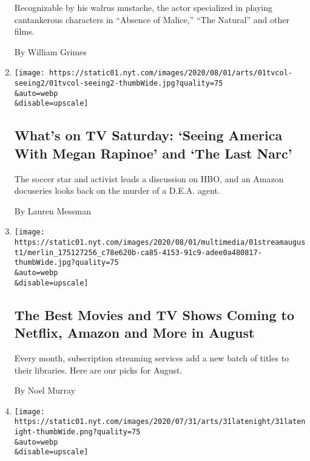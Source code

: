 \begin{enumerate}
  Recognizable by his walrus mustache, the actor specialized in playing
  cantankerous characters in ``Absence of Malice,'' ``The Natural'' and
  other films.

  By William Grimes
\item
  \href{/2020/08/01/arts/television/whats-on-tv-saturday-seeing-america-with-megan-rapinoe-and-the-last-narc.html}{}

  \texttt{[image: https://static01.nyt.com/images/2020/08/01/arts/01tvcol-seeing2/01tvcol-seeing2-thumbWide.jpg?quality=75\\\&auto=webp\\\&disable=upscale]}

  \hypertarget{whats-on-tv-saturday-seeing-america-with-megan-rapinoe-and-the-last-narc}{%
  \subsection{What's on TV Saturday: `Seeing America With Megan Rapinoe'
  and `The Last
  Narc'}\label{whats-on-tv-saturday-seeing-america-with-megan-rapinoe-and-the-last-narc}}

  The soccer star and activist leads a discussion on HBO, and an Amazon
  docuseries looks back on the murder of a D.E.A. agent.

  By Lauren Messman
\item
  \href{/2020/07/31/arts/television/new-to-stream-netflix.html}{}

  \texttt{[image: https://static01.nyt.com/images/2020/08/01/multimedia/01streamaugust1/merlin\_175127256\_c78e620b-ca85-4153-91c9-adee0a480817-thumbWide.jpg?quality=75\\\&auto=webp\\\&disable=upscale]}

  \hypertarget{the-best-movies-and-tv-shows-coming-to-netflix-amazon-and-more-in-august}{%
  \subsection{The Best Movies and TV Shows Coming to Netflix, Amazon and
  More in
  August}\label{the-best-movies-and-tv-shows-coming-to-netflix-amazon-and-more-in-august}}

  Every month, subscription streaming services add a new batch of titles
  to their libraries. Here are our picks for August.

  By Noel Murray
\item
  \href{/2020/07/31/arts/television/late-night-trump-delay-election.html}{}

  \texttt{[image: https://static01.nyt.com/images/2020/07/31/arts/31latenight/31latenight-thumbWide.png?quality=75\\\&auto=webp\\\&disable=upscale]}


\end{enumerate}
